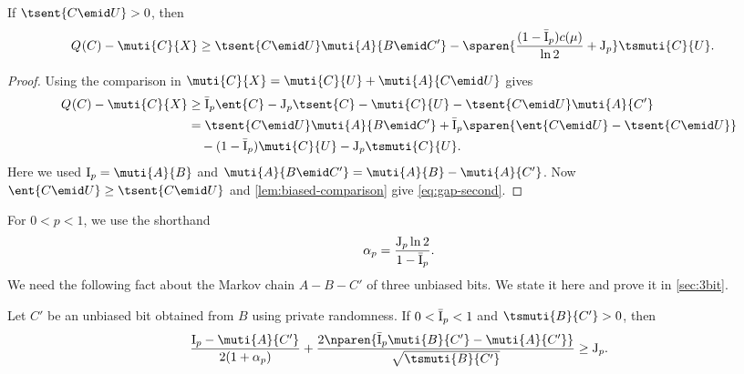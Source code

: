 \begin{lemma}
\label{lem:gap-second}
If $\tsent{C\emid U}>0$, then
\begin{align}
  \label{eq:gap-second}
  \qent{C}-\muti{C}{X}
  &\ge\tsent{C\emid U}\muti{A}{B\emid C'}
  -\sparen{\frac{(1-\qI)c(\mu)}{\ln2}+\qJ}\tsmuti{C}{U}.
\end{align}
\end{lemma}
\begin{proof}
Using the comparison in
$\muti{C}{X}=\muti{C}{U}+\muti{A}{C\emid U}$ gives
\begin{align*}
  \qent{C}-\muti{C}{X}
  &\ge\qI\ent{C}-\qJ\tsent{C}
  -\muti{C}{U}-\tsent{C\emid U}\muti{A}{C'}\\
  &=\tsent{C\emid U}\muti{A}{B\emid C'}
  +\qI\sparen{\ent{C\emid U}-\tsent{C\emid U}}\\
  &\quad-(1-\qI)\muti{C}{U}-\qJ\tsmuti{C}{U}.
\end{align*}
Here we used $\sI=\muti{A}{B}$ and
$\muti{A}{B\emid C'}=\muti{A}{B}-\muti{A}{C'}$.
Now $\ent{C\emid U}\ge\tsent{C\emid U}$ and
\autoref{lem:biased-comparison} give \eqref{eq:gap-second}.
\end{proof}

For $0<p<1$, we use the shorthand
\begin{equation*}
  \alpha_p=\frac{\mathrm{J}_p\ln2}{1-\bar{\mathrm{I}}_p}.
\end{equation*}
We need the following fact about the Markov chain $A-B-C'$
of three unbiased bits. We state it here and prove it in
\autoref{sec:3bit}.

\begin{lemma}
\label{lem:three-bit}
Let $C'$ be an unbiased bit obtained from $B$ using private
randomness. If $0<\bar{\mathrm{I}}_p<1$ and $\tsmuti{B}{C'}>0$, then
\begin{align*}
  \frac{\sI-\muti{A}{C'}}
  {2(1+\alpha_p)}
  +
  \frac{2\nparen{\qI\muti{B}{C'}-\muti{A}{C'}}}
  {\sqrt{\tsmuti{B}{C'}}}
  \ge\qJ.
\end{align*}
\end{lemma}

